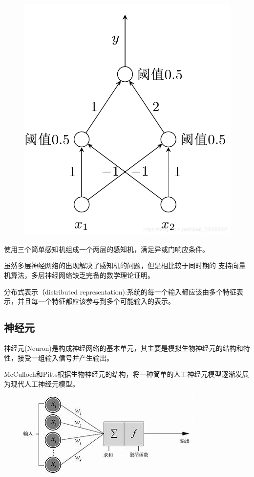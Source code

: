 \documentclass[openbib]{article}
\begin{document}
\begin{figure}[htbp]
	\centering
	\includegraphics[scale=0.2]{多层感知机异或门}
\end{figure}

使用三个简单感知机组成一个两层的感知机，满足异或门响应条件。

虽然多层神经网络的出现解决了感知机的问题，但是相比较于同时期的 支持向量机算法，多层神经网络缺乏完备的数学理论证明。

分布式表示（distributed representation):系统的每一个输入都应该由多个特征表示，并且每一个特征都应该参与到多个可能输入的表示。
\subsection{神经元}
神经元(Neuron)是构成神经网络的基本单元，其主要是模拟生物神经元的结构和特性，接受一组输入信号并产生输出。

McCulloch和Pitts根据生物神经元的结构，将一种简单的人工神经元模型逐渐发展为现代人工神经元模型。
\begin{figure}[htbp]
	\centering
	\includegraphics[scale=0.5]{人工神经元}
\end{figure}
\end{document}
